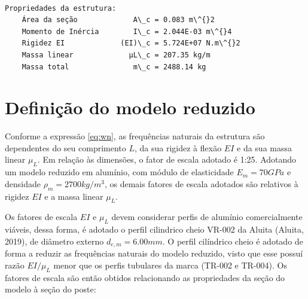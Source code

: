     \begin{Verbatim}[commandchars=\\\{\}]

Propriedades da estrutura:
    Área da seção             A\_c = 0.083 m\^{}2
    Momento de Inércia        I\_c = 2.044E-03 m\^{}4
    Rigidez EI             (EI)\_c = 5.724E+07 N.m\^{}2
    Massa linear             μL\_c = 207.35 kg/m
    Massa total               m\_c = 2488.14 kg

    \end{Verbatim}

    \hypertarget{definiuxe7uxe3o-do-modelo-reduzido}{%
\section{Definição do modelo
reduzido}\label{definiuxe7uxe3o-do-modelo-reduzido}}

Conforme a expressão \ref{eq:wn}, as frequências naturais da estrutura
são dependentes do seu comprimento \(L\), da sua rigidez à flexão \(EI\)
e da sua massa linear \(\mu_L\). Em relação às dimensões, o fator de
escala adotado é 1:25. Adotando um modelo reduzido em alumínio, com
módulo de elasticidade \(E_m=70GPa\) e densidade \(\rho_m=2700kg/m^3\),
os demais fatores de escala adotados são relativos à rigidez \(EI\) e a
massa linear \(\mu_L\).

Os fatores de escala \(EI\) e \(\mu_L\) devem considerar perfis de
alumínio comercialmente viáveis, dessa forma, é adotado o perfil
cilindrico cheio VR-002 da Aluita (Aluita, 2019), de diâmetro externo
\(d_{e,m}=6.00mm\). O perfil cilíndrico cheio é adotado de forma a
reduzir as frequências naturais do modelo reduzido, visto que esse
possuí razão \(EI/\mu_L\) menor que os perfis tubulares da marca (TR-002
e TR-004). Os fatores de escala são então obtidos relacionando as
propriedades da seção do modelo à seção do poste:

